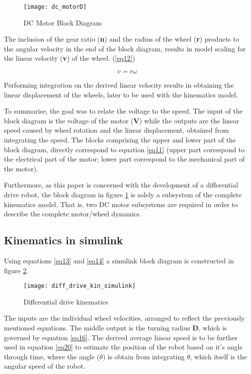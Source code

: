 {\begin{figure}[h]
\centering
\texttt{[image: dc\_motorD]}
\caption{DC Motor Block Diagram}
\label{fig::dcmfigure}
\end{figure}

The inclusion of the gear ratio (\textbf{n}) and the radius of the wheel (\textbf{r}) products to the angular velocity in the end of the block diagram, results in model scaling for the linear velocity (\textbf{v}) of the wheel. (\ref{eq12})

\begin{equation} \label{eq12}
v = r\omega
\end{equation}

Performing integration on the derived linear velocity results in obtaining the linear displacement of the wheels, later to be used with the kinematics model. 

To summarise, the goal was to relate the voltage to the speed. The input of the block diagram is the voltage of the motor (\textbf{V}) while the outputs are the linear speed caused by wheel rotation and the linear displacement, obtained from integrating the speed. The blocks comprising the upper and lower part of the block diagram, directly correspond to equation \ref{eq11} (upper part correspond to the electrical part of the motor; lower part correspond to the mechanical part of the motor).

Furthermore, as this paper is concerned with the development of a differential drive robot, the block diagram in figure \ref{fig::dcmfigure} is solely a subsystem of the complete kinematics model. That is, two DC motor subsystems are required in order to describe the complete motor/wheel dynamics. 


\subsection{Kinematics in simulink} 

Using equations \ref{eq13} and \ref{eq14} a simulink block diagram is constructed in figure \ref{fig::diff_simulink}.

\begin{figure}[h]
\centering
\texttt{[image: diff\_drive\_kin\_simulink]}
\caption{Differential drive kinematics}
\label{fig::diff_simulink}
\end{figure} 

The inputs are the individual wheel velocities, arranged to reflect the previously mentioned equations. The middle output is the turning radius \textbf{D}, which is governed by equation \ref{eq16}. The derived average linear speed is to be further used in equation \ref{eq20} to estimate the position of the robot based on it's angle through time, where the angle ($\theta$) is   obtain from integrating $\dot{\theta}$, which itself is the angular speed of the robot. 

}
